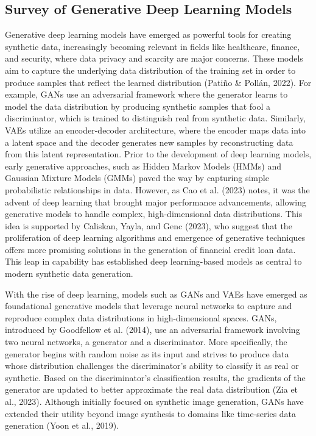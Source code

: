 \documentclass{article}
\begin{document}
\subsection{Survey of Generative Deep Learning Models}

Generative deep learning models have emerged as powerful tools for creating synthetic data, increasingly becoming relevant in fields like healthcare, finance, and security, where data privacy and scarcity are major concerns. These models aim to capture the underlying data distribution of the training set in order to produce samples that reflect the learned distribution (Pati\~no \& Poll\'an, 2022). For example, GANs use an adversarial framework where the generator learns to model the data distribution by producing synthetic samples that fool a discriminator, which is trained to distinguish real from synthetic data. Similarly, VAEs utilize an encoder-decoder architecture, where the encoder maps data into a latent space and the decoder generates new samples by reconstructing data from this latent representation. Prior to the development of deep learning models, early generative approaches, such as Hidden Markov Models (HMMs) and Gaussian Mixture Models (GMMs) paved the way by capturing simple probabilistic relationships in data. However, as Cao et al. (2023) notes, it was the advent of deep learning that brought major performance advancements, allowing generative models to handle complex, high-dimensional data distributions. This idea is supported by Caliskan, Yayla, and Genc (2023), who suggest that the proliferation of deep learning algorithms and emergence of generative techniques offers more promising solutions in the generation of financial credit loan data. This leap in capability has established deep learning-based models as central to modern synthetic data generation. 

With the rise of deep learning, models such as GANs and VAEs have emerged as foundational generative models that leverage neural networks to capture and reproduce complex data distributions in high-dimensional spaces. GANs, introduced by Goodfellow et al. (2014), use an adversarial framework involving two neural networks, a generator and a discriminator. More specifically, the generator begins with random noise as its input and strives to produce data whose distribution challenges the discriminator’s ability to classify it as real or synthetic. Based on the discriminator’s classification results, the gradients of the generator are updated to better approximate the real data distribution (Zia et al., 2023). Although initially focused on synthetic image generation, GANs have extended their utility beyond image synthesis to domains like time-series data generation (Yoon et al., 2019). 
\end{document}
